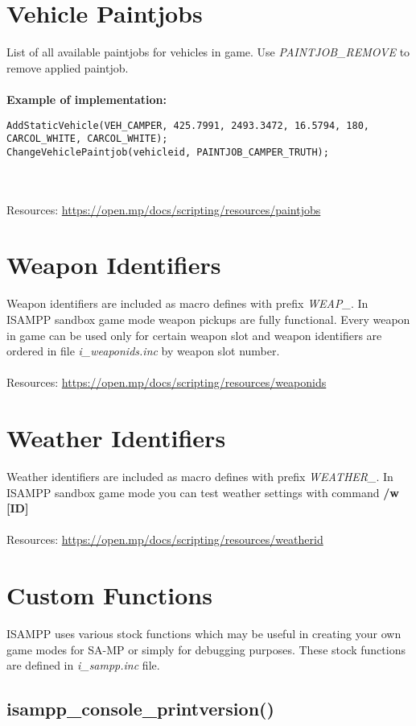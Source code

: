 \documentclass{article}
\begin{document}
\section{Vehicle Paintjobs}
List of all available paintjobs for vehicles in game. Use \textit{PAINTJOB\_REMOVE} to remove applied paintjob.
\\
\\
\textbf{Example of implementation:}
\begin{verbatim}
AddStaticVehicle(VEH_CAMPER, 425.7991, 2493.3472, 16.5794, 180, CARCOL_WHITE, CARCOL_WHITE);
ChangeVehiclePaintjob(vehicleid, PAINTJOB_CAMPER_TRUTH);
\end{verbatim}
\\
\\Resources: \url{https://open.mp/docs/scripting/resources/paintjobs}


\section{Weapon Identifiers}
Weapon identifiers are included as macro defines with prefix \textit{WEAP\_}. In ISAMPP sandbox game mode weapon pickups are fully functional. Every weapon in game can be used only for certain weapon slot and weapon identifiers are ordered in file \textit{i\_weaponids.inc} by weapon slot number.
\\
\\Resources: \url{https://open.mp/docs/scripting/resources/weaponids}


\section{Weather Identifiers}
Weather identifiers are included as macro defines with prefix \textit{WEATHER\_}. In ISAMPP sandbox game mode you can test weather settings with command \textbf{/w [ID]}
\\
\\Resources: \url{https://open.mp/docs/scripting/resources/weatherid}


\newpage
\section{Custom Functions}

ISAMPP uses various stock functions which may be useful in creating your own game modes for SA-MP or simply for debugging purposes. These stock functions are defined in \textit{i\_sampp.inc} file.
\\
\subsection{isampp\_console\_printversion()}
\end{document}
